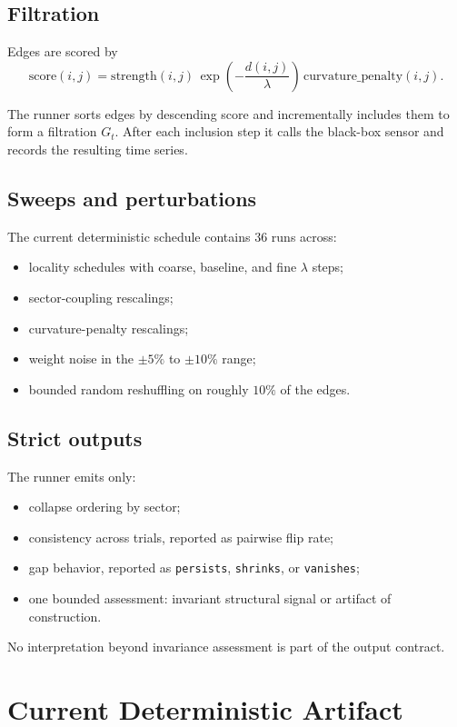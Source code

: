 \documentclass[11pt]{article}
\begin{document}
\subsection{Filtration}

Edges are scored by
\[
\mathrm{score}(i,j)
=
\mathrm{strength}(i,j)\,
\exp\!\left(-\frac{d(i,j)}{\lambda}\right)\,
\mathrm{curvature\_penalty}(i,j).
\]

The runner sorts edges by descending score and incrementally includes them to form a filtration \(G_t\). After each inclusion step it calls the black-box sensor and records the resulting time series.

\subsection{Sweeps and perturbations}

The current deterministic schedule contains \(36\) runs across:
\begin{itemize}
\item locality schedules with coarse, baseline, and fine \(\lambda\) steps;
\item sector-coupling rescalings;
\item curvature-penalty rescalings;
\item weight noise in the \(\pm 5\%\) to \(\pm 10\%\) range;
\item bounded random reshuffling on roughly \(10\%\) of the edges.
\end{itemize}

\subsection{Strict outputs}

The runner emits only:
\begin{itemize}
\item collapse ordering by sector;
\item consistency across trials, reported as pairwise flip rate;
\item gap behavior, reported as \texttt{persists}, \texttt{shrinks}, or \texttt{vanishes};
\item one bounded assessment: invariant structural signal or artifact of construction.
\end{itemize}

No interpretation beyond invariance assessment is part of the output contract.

\section{Current Deterministic Artifact}
\end{document}
